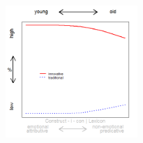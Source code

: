 \documentclass[12pt, table]{beamer}
\begin{document}
\begin{frame}
\begin{minipage}[t]{\linewidth}
\begin{minipage}{.45\linewidth}
\begin{tabular}{cccccccccc }
\end{tabular}
\end{minipage}
\hfill
\begin{minipage}{.45\linewidth}
\begin{figure}
\includegraphics[width=5cm]{images/LangChang19.png}
\end{figure}
\end{minipage}
\end{minipage}
\end{frame}
\end{document}
